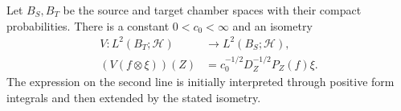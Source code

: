 \begin{theorem}\label{thm:heights-isometry}
Let $B_S,B_T$ be the source and target chamber spaces with their compact
probabilities.  There is a constant $0<c_0<\infty$ and an isometry
\begin{equation}\label{eq:input-22}
 \begin{split}
 V:L^2(B_T;\mathcal H)&\longrightarrow L^2(B_S;\mathcal H),\\
 (V(f\otimes\xi))(Z)&=c_0^{-1/2}D_Z^{-1/2}P_Z(f)\xi.
 \end{split}
\end{equation}
The expression on the second line is initially interpreted through positive
form integrals and then extended by the stated isometry.
\end{theorem}

